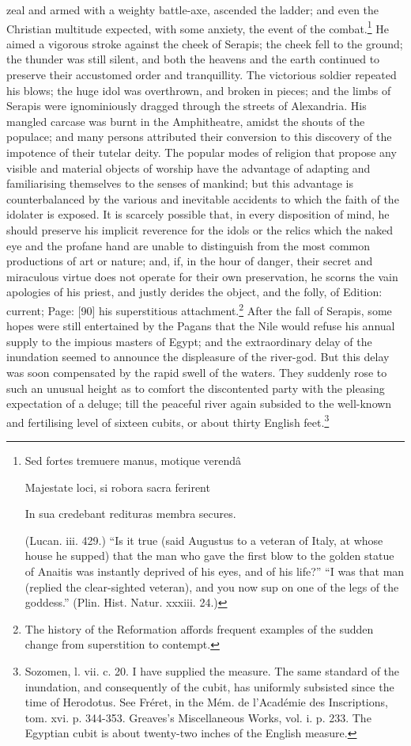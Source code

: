 zeal and armed with a weighty battle-axe, ascended the ladder; and even the Christian multitude expected, with some anxiety, the event of the combat.\footnote{Sed fortes tremuere manus, motique verendâ

Majestate loci, si robora sacra ferirent

In sua credebant redituras membra secures.

(Lucan. iii. 429.) \texthebrew{“}Is it true (said Augustus to a veteran of Italy, at whose house he supped) that the man who gave the first blow to the golden statue of Anaitis was instantly deprived of his eyes, and of his life?\texthebrew{” “}I was that man (replied the clear-sighted veteran), and you now sup on one of the legs of the goddess.\texthebrew{}” (Plin. Hist. Natur. xxxiii. 24.)} He aimed a vigorous stroke against the cheek of Serapis; the cheek fell to the ground; the thunder was still silent, and both the heavens and the earth continued to preserve their accustomed order and tranquillity. The victorious soldier repeated his blows; the huge idol was overthrown, and broken in pieces; and the limbs of Serapis were ignominiously dragged through the streets of Alexandria. His mangled carcase was burnt in the Amphitheatre, amidst the shouts of the populace; and many persons attributed their conversion to this discovery of the impotence of their tutelar deity. The popular modes of religion that propose any visible and material objects of worship have the advantage of adapting and familiarising themselves to the senses of mankind; but this advantage is counterbalanced by the various and inevitable accidents to which the faith of the idolater is exposed. It is scarcely possible that, in every disposition of mind, he should preserve his implicit reverence for the idols or the relics which the naked eye and the profane hand are unable to distinguish from the most common productions of art or nature; and, if, in the hour of danger, their secret and miraculous virtue does not operate for their own preservation, he scorns the vain apologies of his priest, and justly derides the object, and the folly, of Edition: current; Page: [90] his superstitious attachment.\footnote{The history of the Reformation affords frequent examples of the sudden change from superstition to contempt.} After the fall of Serapis, some hopes were still entertained by the Pagans that the Nile would refuse his annual supply to the impious masters of Egypt; and the extraordinary delay of the inundation seemed to announce the displeasure of the river-god. But this delay was soon compensated by the rapid swell of the waters. They suddenly rose to such an unusual height as to comfort the discontented party with the pleasing expectation of a deluge; till the peaceful river again subsided to the well-known and fertilising level of sixteen cubits, or about thirty English feet.\footnote{Sozomen, l. vii. c. 20. I have supplied the measure. The same standard of the inundation, and consequently of the cubit, has uniformly subsisted since the time of Herodotus. See Fréret, in the Mém. de l\texthebrew{}’Académie des Inscriptions, tom. xvi. p. 344-353. Greaves\texthebrew{}’s Miscellaneous Works, vol. i. p. 233. The Egyptian cubit is about twenty-two inches of the English measure.}

